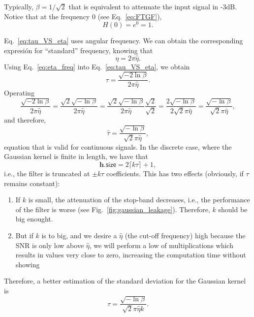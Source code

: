 \begin{subappendices}
Typically, $\beta=1/\sqrt{2}$ that is equivalent to attenuate the
input signal in -3dB. Notice that at the frequency 0 (see
Eq.~\ref{eq:FTGF}),
\begin{equation*}
  H(0) = e^0=1.
\end{equation*}

Eq.~\ref{eq:tau_VS_eta} uses angular frequency. We can obtain the
corresponding expresión for ``standard'' frequency, knowing that
\begin{equation}
  \eta = 2\pi\hat{\eta}.
  \label{eq:eta_freq}
\end{equation}
Using Eq.~\ref{eq:eta_freq} into Eq.~\ref{eq:tau_VS_eta}, we obtain
\begin{equation}
  \tau = \frac{\sqrt{-2\ln\beta}}{2\pi\hat{\eta}}.
  \label{eq:tau_VS_eta_standard}
\end{equation}
Operating
\begin{equation*}
  \frac{\sqrt{-2\ln\beta}}{2\pi\hat{\eta}} = \frac{\sqrt{2}\sqrt{-\ln\beta}}{2\pi\hat{\eta}} = \frac{\sqrt{2}\sqrt{-\ln\beta}}{2\pi\hat{\eta}}\frac{\sqrt{2}}{\sqrt{2}} = \frac{2\sqrt{-\ln\beta}}{2\sqrt{2}\pi\hat{\eta}} = \frac{\sqrt{-\ln\beta}}{\sqrt{2}\pi\hat{\eta}},
\end{equation*}
and therefore,
\begin{equation}
  \hat{\tau} = \frac{\sqrt{-\ln\beta}}{\sqrt{2}\pi\hat{\eta}},
  \label{eq:ideal_hat_tau}
\end{equation}
equation that is valid for continuous signals. In the discrete case,
where the Gaussian kernel is finite in length, we have that
\begin{equation}
  \mathbf{h}.\mathsf{size} = 2\lceil k\tau\rceil + 1,
  \label{eq:kernel_length}
\end{equation}
i.e., the filter is truncated at $\pm k\tau$ coefficients. This has
two effects (obviously, if $\tau$ remains constant):
\begin{enumerate}
\item If $k$ is small, the attenuation of the stop-band decreases,
  i.e., the performance of the filter is worse (see
  Fig.~\ref{fig:gaussian_leakage}). Therefore, $k$ should be big
  enought.
\item But if $k$ is to big, and we desire a $\hat{\eta}$ (the cut-off
  frequency) high because the SNR is only low above $\hat{\eta}$, we
  will perform a low of multiplications which results in values very
  close to zero, increasing the computation time without showing
\end{enumerate}
Therefore, a better estimation of the standard deviation for the
Gaussian kernel is
\begin{equation}
  \tau = \frac{\sqrt{-\ln\beta}}{\sqrt{2}\pi\hat{\eta}k}.
  \label{eq:ideal_hat_tau}
\end{equation}


\end{subappendices}
